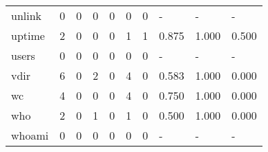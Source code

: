 \begin{longtable}{lp{2.0cm}p{2.0cm}p{2.0cm}p{2.0cm}p{2.0cm}p{2.0cm}p{2.0cm}p{2.0cm}p{2.0cm}}
unlink    &                      0 &                                             0 &                                            0 &                                           0 &                                            0 &                                          0 &                                    - &                                      - &                                    - \\
uptime    &                      2 &                                             0 &                                            0 &                                           0 &                                            1 &                                          1 &                                0.875 &                                  1.000 &                                0.500 \\
users     &                      0 &                                             0 &                                            0 &                                           0 &                                            0 &                                          0 &                                    - &                                      - &                                    - \\
vdir      &                      6 &                                             0 &                                            2 &                                           0 &                                            4 &                                          0 &                                0.583 &                                  1.000 &                                0.000 \\
wc        &                      4 &                                             0 &                                            0 &                                           0 &                                            4 &                                          0 &                                0.750 &                                  1.000 &                                0.000 \\
who       &                      2 &                                             0 &                                            1 &                                           0 &                                            1 &                                          0 &                                0.500 &                                  1.000 &                                0.000 \\
whoami    &                      0 &                                             0 &                                            0 &                                           0 &                                            0 &                                          0 &                                    - &                                      - &                                    - \\

\end{longtable}
